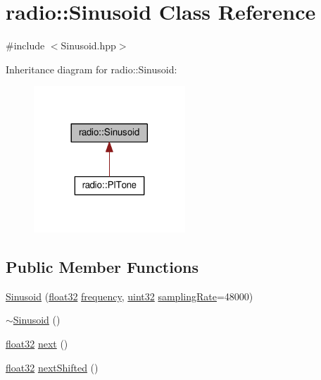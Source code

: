 \hypertarget{classradio_1_1Sinusoid}{\section{radio\+:\+:Sinusoid Class Reference}
\label{classradio_1_1Sinusoid}
}


{\ttfamily \#include $<$Sinusoid.\+hpp$>$}



Inheritance diagram for radio\+:\+:Sinusoid\+:
\nopagebreak
\begin{figure}[H]
\begin{center}
\leavevmode
\includegraphics[width=161pt]{classradio_1_1Sinusoid__inherit__graph}
\end{center}
\end{figure}
\subsection*{Public Member Functions}
\begin{DoxyCompactItemize}
\item 
\hyperlink{classradio_1_1Sinusoid_a9494c3cb2bca12effdf770e10dfbe8a5}{Sinusoid} (\hyperlink{definitions_8hpp_aacdc525d6f7bddb3ae95d5c311bd06a1}{float32} \hyperlink{classradio_1_1Sinusoid_ad429b5dd330e96aaf89a0d48ef59d3f2}{frequency}, \hyperlink{definitions_8hpp_a1134b580f8da4de94ca6b1de4d37975e}{uint32} \hyperlink{classradio_1_1Sinusoid_a964d64aae9acc4ea5d752534a33d76b8}{sampling\+Rate}=48000)
\item 
\hyperlink{classradio_1_1Sinusoid_ad9e8edf233f8146891a14f20d1c903d2}{$\sim$\+Sinusoid} ()
\item 
\hyperlink{definitions_8hpp_aacdc525d6f7bddb3ae95d5c311bd06a1}{float32} \hyperlink{classradio_1_1Sinusoid_aab44298ea1bd5cb175d5826243cf56f2}{next} ()
\item 
\hyperlink{definitions_8hpp_aacdc525d6f7bddb3ae95d5c311bd06a1}{float32} \hyperlink{classradio_1_1Sinusoid_a3f2741e9dd30291e5fa87f2eb2243e7c}{next\+Shifted} ()
\end{DoxyCompactItemize}
